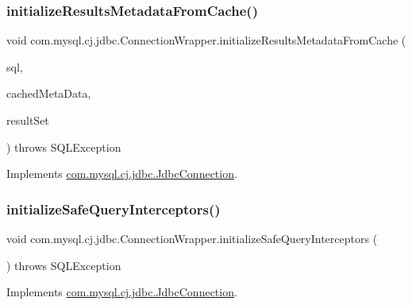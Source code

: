 \subsubsection{\texorpdfstring{initialize\+Results\+Metadata\+From\+Cache()}{initializeResultsMetadataFromCache()}}
{\footnotesize\ttfamily void com.\+mysql.\+cj.\+jdbc.\+Connection\+Wrapper.\+initialize\+Results\+Metadata\+From\+Cache (\begin{DoxyParamCaption}\item[{String}]{sql,  }\item[{\mbox{\hyperlink{interfacecom_1_1mysql_1_1cj_1_1jdbc_1_1result_1_1_cached_result_set_meta_data}{Cached\+Result\+Set\+Meta\+Data}}}]{cached\+Meta\+Data,  }\item[{\mbox{\hyperlink{interfacecom_1_1mysql_1_1cj_1_1jdbc_1_1result_1_1_result_set_internal_methods}{Result\+Set\+Internal\+Methods}}}]{result\+Set }\end{DoxyParamCaption}) throws S\+Q\+L\+Exception}



Implements \mbox{\hyperlink{interfacecom_1_1mysql_1_1cj_1_1jdbc_1_1_jdbc_connection_adaeb33edd797d27f3836f5cab30c51d0}{com.\+mysql.\+cj.\+jdbc.\+Jdbc\+Connection}}.

\mbox{\label{classcom_1_1mysql_1_1cj_1_1jdbc_1_1_connection_wrapper_a6094098ee3f338f03ea1e6a4344d2857}} 
\subsubsection{\texorpdfstring{initialize\+Safe\+Query\+Interceptors()}{initializeSafeQueryInterceptors()}}
{\footnotesize\ttfamily void com.\+mysql.\+cj.\+jdbc.\+Connection\+Wrapper.\+initialize\+Safe\+Query\+Interceptors (\begin{DoxyParamCaption}{ }\end{DoxyParamCaption}) throws S\+Q\+L\+Exception}



Implements \mbox{\hyperlink{interfacecom_1_1mysql_1_1cj_1_1jdbc_1_1_jdbc_connection_a48b2a3226fefc00bf09985a66da96d90}{com.\+mysql.\+cj.\+jdbc.\+Jdbc\+Connection}}.

